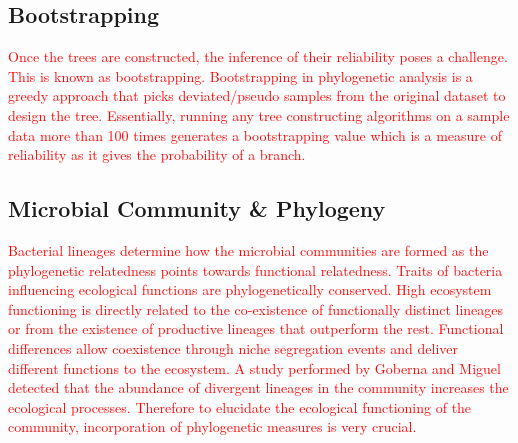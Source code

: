 \subsection{Bootstrapping}

\textcolor{red}{Once the trees are constructed, the inference of their reliability poses a challenge. This is known as bootstrapping. Bootstrapping in phylogenetic analysis is a greedy approach that picks deviated/pseudo samples from the original dataset to design the tree. Essentially, running any tree constructing algorithms on a sample data more than 100 times generates a bootstrapping value which is a measure of reliability as it gives the probability of a branch.}

\subsection{Microbial Community \& Phylogeny}

\textcolor{red}{Bacterial lineages determine how the microbial communities are formed as the phylogenetic relatedness points towards functional relatedness. Traits of bacteria influencing ecological functions are phylogenetically conserved. High ecosystem functioning is directly related to the co-existence of functionally distinct lineages or from the existence of productive lineages that outperform the rest. Functional differences allow coexistence through niche segregation events and deliver different functions to the ecosystem. A study performed by Goberna and Miguel detected that the abundance of divergent lineages in the community increases the ecological processes. Therefore to elucidate the ecological functioning of the community, incorporation of phylogenetic measures is very crucial.}